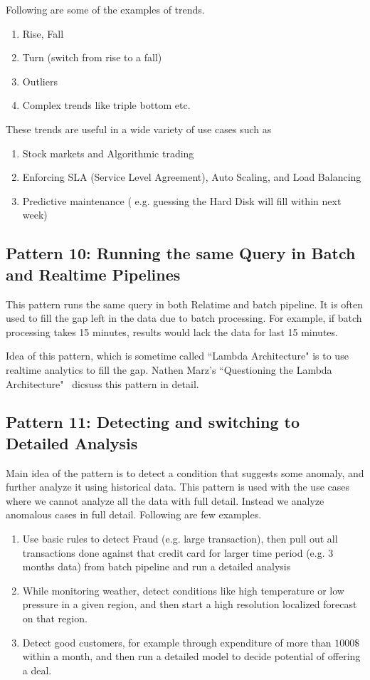 \documentclass{sig-alternate}
\begin{document}
Following are some of the examples of trends. 

\begin{enumerate}
\item Rise, Fall
\item Turn (switch from rise to a fall)
\item Outliers
\item Complex trends like triple bottom etc.
\end{enumerate}

These trends are useful in a wide variety of use cases such as 

\begin{enumerate}
\item Stock markets and Algorithmic trading 
\item Enforcing SLA (Service Level Agreement), Auto Scaling, and Load Balancing 
\item Predictive maintenance ( e.g. guessing the Hard Disk will fill within next week)   
\end{enumerate}

\subsection{Pattern 10: Running the same Query in Batch and Realtime Pipelines}

This pattern runs the same query in both Relatime and batch pipeline. It is often used to fill the gap left in the data due to batch processing. For example, if batch processing takes 15 minutes, results would lack the data for last 15 minutes. 

Idea of this pattern, which is sometime called ``Lambda Architecture" is to use realtime analytics to fill the gap. Nathen Marz's ``Questioning the Lambda Architecture"~\cite{lambdaQ} dicsuss this pattern in detail.


\subsection{Pattern 11: Detecting and switching to Detailed Analysis}
Main idea of the pattern is to detect a condition that suggests some anomaly, and further analyze it using historical data.  This pattern is used with the use cases where we cannot analyze all the data with full detail. Instead we analyze anomalous cases in full detail. Following are few examples. 

\begin{enumerate}
\item Use basic rules to detect Fraud (e.g. large transaction), then pull out all transactions done against that credit card for larger time period (e.g. 3 months data) from batch pipeline and run a detailed analysis 
\item While monitoring weather, detect conditions like high temperature or low pressure in a given region, and then start a high resolution localized forecast on that region. 
\item Detect good customers, for example through expenditure of more than $1000\$$ within a month, and then run a detailed model to decide potential of offering a deal. 
\end{enumerate}
\end{document}
